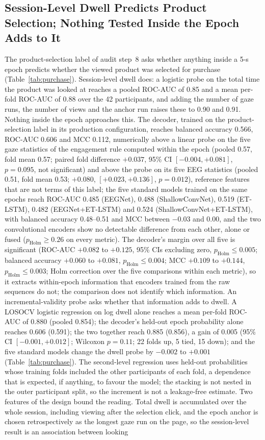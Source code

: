\subsection{Session-Level Dwell Predicts Product Selection; Nothing Tested Inside the Epoch Adds to It}\label{res:rq4}

The product-selection label of audit step~8 asks whether anything inside a 5-s epoch predicts whether the viewed product was selected for purchase (Table~\ref{tab:purchase}). Session-level dwell does: a logistic probe on the total time the product was looked at reaches a pooled ROC-AUC of 0.85 and a mean per-fold ROC-AUC of 0.88 over the 42 participants, and adding the number of gaze runs, the number of views and the anchor run raises these to 0.90 and 0.91. Nothing inside the epoch approaches this. The decoder, trained on the product-selection label in its production configuration, reaches balanced accuracy 0.566, ROC-AUC 0.606 and MCC 0.112, numerically above a linear probe on the five gaze statistics of the engagement rule computed within the epoch (pooled 0.57, fold mean 0.57; paired fold difference $+0.037$, 95\% CI $[-0.004, +0.081]$, $p=0.095$, not significant) and above the probe on its five EEG statistics (pooled 0.51, fold mean 0.53; $+0.080$, $[+0.023, +0.136]$, $p=0.012$), reference features that are not terms of this label; the five standard models trained on the same epochs reach ROC-AUC 0.485 (EEGNet), 0.488 (ShallowConvNet), 0.519 (ET-LSTM), 0.482 (EEGNet+ET-LSTM) and 0.524 (ShallowConvNet+ET-LSTM), with balanced accuracy 0.48--0.51 and MCC between $-0.03$ and $0.00$, and the two convolutional encoders show no detectable difference from each other, alone or fused ($p_{\mathrm{Holm}}\ge0.26$ on every metric). The decoder's margin over all five is significant (ROC-AUC $+0.082$ to $+0.125$, 95\% CIs excluding zero, $p_{\mathrm{Holm}}\le0.005$; balanced accuracy $+0.060$ to $+0.081$, $p_{\mathrm{Holm}}\le0.004$; MCC $+0.109$ to $+0.144$, $p_{\mathrm{Holm}}\le0.003$; Holm correction over the five comparisons within each metric), so it extracts within-epoch information that encoders trained from the raw sequences do not; the comparison does not identify which information. An incremental-validity probe asks whether that information adds to dwell. A LOSOCV logistic regression on log dwell alone reaches a mean per-fold ROC-AUC of 0.880 (pooled 0.854); the decoder's held-out epoch probability alone reaches 0.606 (0.591); the two together reach 0.885 (0.856), a gain of 0.005 (95\% CI $[-0.001, +0.012]$; Wilcoxon $p=0.11$; 22 folds up, 5 tied, 15 down); and the five standard models change the dwell probe by $-0.002$ to $+0.001$ (Table~\ref{tab:purchase}). The second-level regression uses held-out probabilities whose training folds included the other participants of each fold, a dependence that is expected, if anything, to favour the model; the stacking is not nested in the outer participant split, so the increment is not a leakage-free estimate. Two features of the design bound the reading. Total dwell is accumulated over the whole session, including viewing after the selection click, and the epoch anchor is chosen retrospectively as the longest gaze run on the page, so the session-level result is an association between looking 
